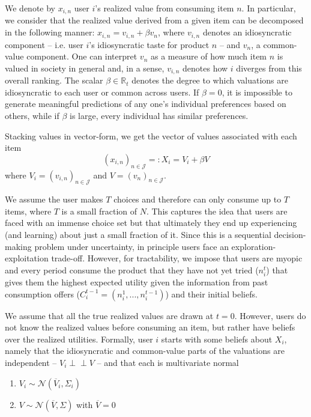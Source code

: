 \documentclass[format=acmsmall, review=false]{acmart}
\newcommand{\xhdr}[1]{\vspace{1mm} \noindent{\bf #1}}
\begin{document}
We denote by $x_{i,n}$ user $i$'s realized value from consuming item $n$. In particular, we consider that the realized value derived from a given item can be decomposed in the following manner: $x_{i,n}= v_{i,n} + \beta v_n$, where $v_{i,n}$ denotes an idiosyncratic component -- i.e. user $i$'s idiosyncratic taste for product $n$ --  and $v_{n}$, a common-value component. One can interpret $v_n$ as a measure of how much item $n$ is valued in society in general and, in a sense, $v_{i,n}$ denotes how $i$ diverges from this overall ranking. The scalar $\beta \in \mathbb{R}_{t}$ denotes the degree to which valuations are idiosyncratic to each user or common across users. If $\beta=0$, it is impossible to generate meaningful predictions of any one's individual preferences based on others, while if $\beta$ is large, every individual has similar preferences.
\par
Stacking values in vector-form, we get the vector of values associated with each item 
$${\left(x_{i,n}\right)}_{n \in \mathcal{J}}=:X_i =V_i+ \beta V $$
where $V_i ={\left(v_{i,n}\right)}_{n \in \mathcal{J}}$ and $V={\left(v_{n}\right)}_{n \in \mathcal{J}}$.
\par
\xhdr{User Decision-Making.}
We assume the user makes $T$ choices and therefore can only consume up to $T$ items, where $T$ is a small fraction of $N$. This captures the idea that users are faced with an immense choice set but that ultimately they end up experiencing (and learning) about just a small fraction of it. Since this is a sequential decision-making problem under uncertainty, in principle users face an exploration-exploitation trade-off. However, for tractability, we impose that users are myopic and every period consume the product that they have not yet tried ($n_i^t$) that gives them the highest expected utility given the information from past consumption offers ($C_i^{t-1}=(n_i^1,...,n_i^{t-1})$) and their initial beliefs.
\par
\xhdr{User Beliefs.} We assume that all the true realized values are drawn at $t = 0$. However, users do not know the realized values before consuming an item, but rather have beliefs over the realized utilities.
Formally, user $i$ starts with some beliefs about $X_i$, namely that the idiosyncratic and common-value parts of the valuations are independent -- $V_i \perp \!\!\! \perp V$ -- and that each is multivariate normal 
\begin{enumerate}[topsep=0pt]
\item $V_i \sim \mathcal N (\overline V_i, \Sigma_i)$ 
\item $V \sim \mathcal N(\overline V, \Sigma)$ with $\overline V =0$
\end{enumerate}
\end{document}
